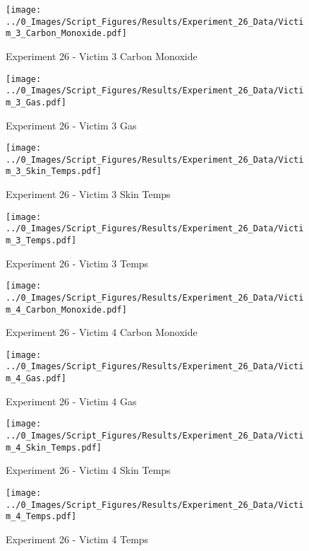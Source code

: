 	\clearpage

	\begin{figure}[H]
		\centering
		\texttt{[image: ../0\_Images/Script\_Figures/Results/Experiment\_26\_Data/Victim\_3\_Carbon\_Monoxide.pdf]}
		\caption[]{Experiment 26 - Victim 3 Carbon Monoxide}
	\end{figure}
 

	\begin{figure}[H]
		\centering
		\texttt{[image: ../0\_Images/Script\_Figures/Results/Experiment\_26\_Data/Victim\_3\_Gas.pdf]}
		\caption[]{Experiment 26 - Victim 3 Gas}
	\end{figure}
 
	\clearpage

	\begin{figure}[H]
		\centering
		\texttt{[image: ../0\_Images/Script\_Figures/Results/Experiment\_26\_Data/Victim\_3\_Skin\_Temps.pdf]}
		\caption[]{Experiment 26 - Victim 3 Skin Temps}
	\end{figure}
 

	\begin{figure}[H]
		\centering
		\texttt{[image: ../0\_Images/Script\_Figures/Results/Experiment\_26\_Data/Victim\_3\_Temps.pdf]}
		\caption[]{Experiment 26 - Victim 3 Temps}
	\end{figure}
 
	\clearpage

	\begin{figure}[H]
		\centering
		\texttt{[image: ../0\_Images/Script\_Figures/Results/Experiment\_26\_Data/Victim\_4\_Carbon\_Monoxide.pdf]}
		\caption[]{Experiment 26 - Victim 4 Carbon Monoxide}
	\end{figure}
 

	\begin{figure}[H]
		\centering
		\texttt{[image: ../0\_Images/Script\_Figures/Results/Experiment\_26\_Data/Victim\_4\_Gas.pdf]}
		\caption[]{Experiment 26 - Victim 4 Gas}
	\end{figure}
 
	\clearpage

	\begin{figure}[H]
		\centering
		\texttt{[image: ../0\_Images/Script\_Figures/Results/Experiment\_26\_Data/Victim\_4\_Skin\_Temps.pdf]}
		\caption[]{Experiment 26 - Victim 4 Skin Temps}
	\end{figure}
 

	\begin{figure}[H]
		\centering
		\texttt{[image: ../0\_Images/Script\_Figures/Results/Experiment\_26\_Data/Victim\_4\_Temps.pdf]}
		\caption[]{Experiment 26 - Victim 4 Temps}
	\end{figure}
 
